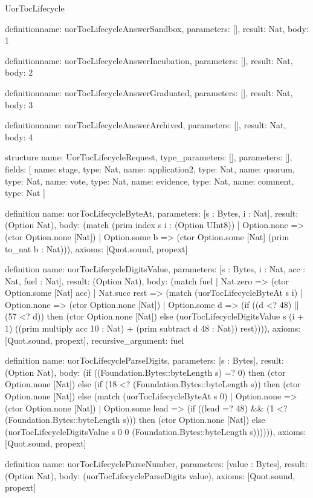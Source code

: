 \begin{lexlean}{UorTocLifecycle}
\begin{semanticmodule}
definition{name: uorTocLifecycleAnswerSandbox, parameters: [], result: Nat, body: 1}

definition{name: uorTocLifecycleAnswerIncubation, parameters: [], result: Nat, body: 2}

definition{name: uorTocLifecycleAnswerGraduated, parameters: [], result: Nat, body: 3}

definition{name: uorTocLifecycleAnswerArchived, parameters: [], result: Nat, body: 4}

structure{
  name: UorTocLifecycleRequest,
  type_parameters: [],
  parameters: [],
  fields: [
    {name: stage, type: Nat},
    {name: application2, type: Nat},
    {name: quorum, type: Nat},
    {name: vote, type: Nat},
    {name: evidence, type: Nat},
    {name: comment, type: Nat}
  ]
}

definition{
  name: uorTocLifecycleByteAt,
  parameters: [s : Bytes, i : Nat],
  result: (Option Nat),
  body: (match (prim index s i : (Option UInt8))
    | Option.none => (ctor Option.none [Nat])
    | Option.some b => (ctor Option.some [Nat] (prim to_nat b : Nat))),
  axioms: [Quot.sound, propext]
}

definition{
  name: uorTocLifecycleDigitsValue,
  parameters: [s : Bytes, i : Nat, acc : Nat, fuel : Nat],
  result: (Option Nat),
  body: (match fuel
    | Nat.zero => (ctor Option.some [Nat] acc)
    | Nat.succ rest => (match (uorTocLifecycleByteAt s i)
      | Option.none => (ctor Option.none [Nat])
      | Option.some d => (if ((d <? 48) || (57 <? d)) then (ctor Option.none [Nat]) else (uorTocLifecycleDigitsValue s (i + 1) ((prim multiply acc 10 : Nat) + (prim subtract d 48 : Nat)) rest)))),
  axioms: [Quot.sound, propext],
  recursive_argument: fuel
}

definition{
  name: uorTocLifecycleParseDigits,
  parameters: [s : Bytes],
  result: (Option Nat),
  body: (if ((Foundation.Bytes::byteLength s) =? 0) then (ctor Option.none [Nat]) else (if (18 <? (Foundation.Bytes::byteLength s)) then (ctor Option.none [Nat]) else (match (uorTocLifecycleByteAt s 0)
    | Option.none => (ctor Option.none [Nat])
    | Option.some lead => (if ((lead =? 48) && (1 <? (Foundation.Bytes::byteLength s))) then (ctor Option.none [Nat]) else (uorTocLifecycleDigitsValue s 0 0 (Foundation.Bytes::byteLength s)))))),
  axioms: [Quot.sound, propext]
}

definition{
  name: uorTocLifecycleParseNumber,
  parameters: [value : Bytes],
  result: (Option Nat),
  body: (uorTocLifecycleParseDigits value),
  axioms: [Quot.sound, propext]
}


\end{semanticmodule}
\end{lexlean}
